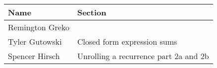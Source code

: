 \documentclass{article}
\begin{document}
\pagebreak

\begin{center}
        \begin{tabular}{|p{3cm}|p{6cm}|}
            \hline
            \textbf{Name} & \textbf{Section} \\
            \hline
            Remington Greko & \\
            \hline
            Tyler Gutowski & Closed form expression sums\\
            \hline
            Spencer Hirsch & Unrolling a recurrence part 2a and 2b \\
            \hline
        \end{tabular}
    \end{center}
\end{document}
